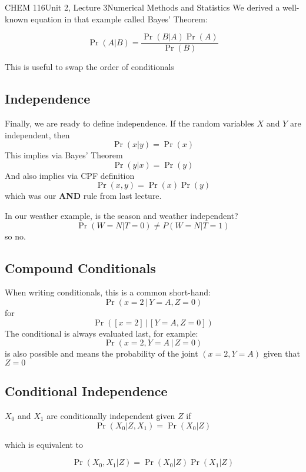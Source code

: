 \documentclass{article}
\begin{document}
\begin{tdoc}{CHEM 116}{Unit 2, Lecture 3}{Numerical Methods and Statistics}
We derived a well-known equation in that example called Bayes' Theorem:

\begin{equation}
\Pr(A|B) = \frac{\Pr(B|A)\Pr(A)}{\Pr(B)}
\end{equation}

This is useful to swap the order of conditionals

\subsection{Independence}
Finally, we are ready to define independence. If the random variables
$X$ and $Y$ are independent, then
\begin{equation}
\Pr(x|y) = \Pr(x)
\end{equation}
This implies via Bayes' Theorem
\begin{equation}
\Pr(y|x) = \Pr(y)
\end{equation}
And also implies via CPF definition
\begin{equation}
\Pr(x,y) = \Pr(x)\Pr(y)
\end{equation}
which was our {\bf AND} rule from last lecture.

\vspace{0.2cm}
In our weather example, is the season and weather independent?
\[
\Pr(W=N|T=0) \neq P(W=N|T=1)
\]
so no.


\subsection{Compound Conditionals}
When writing conditionals, this is a common short-hand:
\[
\Pr (x = 2\, | \,Y = A, Z = 0)
\]
for
\[
\Pr ([x = 2]\,|\, [Y = A, Z = 0])
\]
The conditional is always evaluated last, for example:
\[
\Pr(x = 2, Y = A\, | \,Z = 0)
\]
is also possible and means the probability of the joint $(x=2, Y=A)$
given that $Z = 0$



\subsection{Conditional Independence}
$X_0$ and $X_1$ are conditionally independent given $Z$ if
\begin{equation}
\Pr(X_0 | Z, X_1) = \Pr(X_0 | Z)
\end{equation}

which is equivalent to

\begin{equation}
\Pr(X_0, X_1 | Z) = \Pr(X_0 | Z)\Pr(X_1 | Z)
\end{equation}



\end{tdoc}
\end{document}
